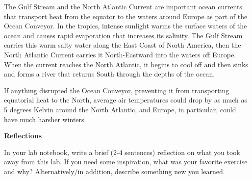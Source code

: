 \documentclass[letterpaper,11pt]{article}
\begin{document}
\begin{enumerate}


The Gulf Stream and the North Atlantic Current are important ocean currents that transport heat from the equator to the waters around Europe as part of the Ocean Conveyor.  In the tropics, intense sunlight warms the surface waters of the ocean and causes rapid evaporation that increases its salinity. The Gulf Stream carries this warm salty water along the East Coast of North America, then the North Atlantic Current carries it North-Eastward into the waters off Europe.  When the current reaches the North Atlantic, it begins to cool off and then sinks and forms a river that returns South through the depths of the ocean.


If anything disrupted the Ocean Conveyor, preventing it from transporting equatorial heat to the North, average air temperatures could drop by as much as 5 degrees Kelvin around the North Atlantic, and Europe, in particular, could have much harsher winters.



\vspace{.3in}
\textbf{Reflections}
\vspace{.1in}

\noindent In your lab notebook, write a brief (2-4 sentences) reflection on what you took away from this lab. If you need some inspiration, what was your favorite exercise and why? Alternatively/in addition, describe something new you learned.


\end{enumerate}
\end{document}

